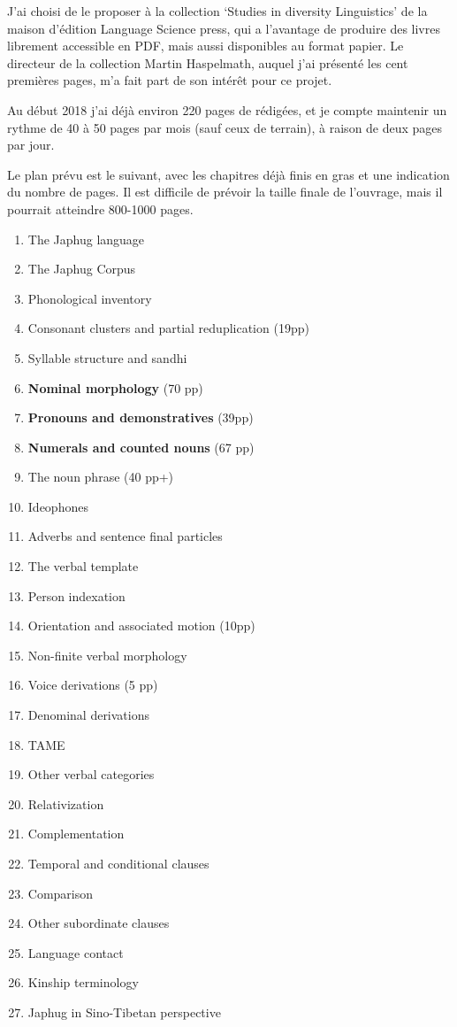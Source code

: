 \documentclass[oldfontcommands,oneside,a4paper,11pt]{article}
\begin{document}
J'ai choisi de le proposer à la collection  `Studies in diversity Linguistics' de la maison d'édition Language Science press, qui a l'avantage de produire des livres librement accessible en PDF, mais aussi disponibles au format papier. Le directeur de la collection Martin Haspelmath, auquel j'ai présenté les cent premières pages, m'a fait part de son intérêt pour ce projet.

Au début 2018 j'ai déjà environ 220 pages de rédigées, et je compte maintenir un rythme de 40 à 50 pages par mois (sauf ceux de terrain), à raison de deux pages par jour.

Le plan prévu est le suivant, avec les chapitres déjà finis en gras et une indication du nombre de pages. Il est difficile de prévoir la taille finale de l'ouvrage, mais il pourrait atteindre 800-1000 pages.

\begin{enumerate}
\item The Japhug language
\item The Japhug Corpus
\item Phonological inventory 
\item Consonant clusters and partial reduplication (19pp)
\item Syllable structure and sandhi
\item \textbf{Nominal morphology} (70 pp)
\item \textbf{Pronouns and demonstratives}  (39pp)
\item \textbf{Numerals and counted nouns} (67 pp)
\item The noun phrase (40 pp+)
\item Ideophones
\item Adverbs and sentence final particles
\item The verbal template
\item Person indexation
\item Orientation and associated motion (10pp)
\item Non-finite verbal morphology
\item Voice derivations (5 pp)
\item Denominal derivations 
\item TAME
\item Other verbal categories
\item Relativization
\item Complementation
\item Temporal and conditional clauses
\item Comparison
\item Other subordinate clauses
\item Language contact
\item Kinship terminology
\item Japhug in Sino-Tibetan perspective
\end{enumerate}
\end{document}
